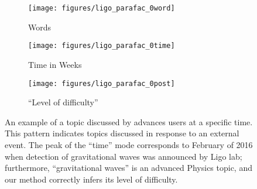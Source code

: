 \begin{figure}
 \begin{subfigure}{0.22\textwidth}  
  \centering  
  \texttt{[image: figures/ligo\_parafac\_0word]}  
    \caption{Words}   
\end{subfigure}   
\begin{subfigure}{0.22\textwidth}  
  \centering  
  \texttt{[image: figures/ligo\_parafac\_0time]}  
    \caption{Time in Weeks}   
\end{subfigure}  

\begin{subfigure}{0.45\textwidth}  
  \centering  
  \texttt{[image: figures/ligo\_parafac\_0post]}  
    \caption{{\footnotesize``Level of difficulty''}}   
\end{subfigure}  
 \caption{\label{fig:ligo}An example of a topic discussed by advances users at a specific time. This pattern indicates topics discussed in response to an external event. The peak of the  ``time'' mode corresponds to February of 2016 when detection of gravitational waves was announced by Ligo lab; furthermore, ``gravitational waves'' is an advanced Physics topic, and our method correctly infers its level of difficulty.}
 \vspace*{-12pt}
\end{figure}


